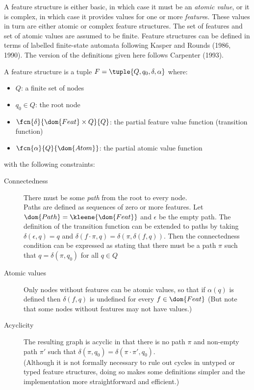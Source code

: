 \documentclass[12pt]{report}
\begin{document}
A feature structure is either basic, in which case it must
be an {\em atomic value}, or it is complex, in which case it
provides values for one or more {\em feature}s.  
These values in turn are either atomic or complex feature structures.
The set  of features and 
set  of atomic values are assumed to be finite.
Feature structures can be defined in terms of
labelled finite-state automata
following Kasper and Rounds (1986, 1990).  The version of the
definitions given here follows Carpenter (1993).    
%
\begin{definition}
A feature structure is a tuple $F =
\tuple{Q,q_{0},\delta,\alpha}$ where:
\begin{itemize}
\item
$Q$:  a finite set of nodes 
\item
$q_{0} \in Q$: the root node
\item
$\fcn{\delta}{\dom{Feat} \times Q}{Q}$:  
the partial feature value function (transition function)
\item
$\fcn{\alpha}{Q}{\dom{Atom}}$: the partial atomic value function
\end{itemize}
with the following constraints:
\begin{description}
\item [Connectedness] 
There must be some {\em path} from the root to every node.\\
Paths are defined as sequences of zero or more features.
Let $\dom{Path} = \kleene{\dom{Feat}}$ and $\epsilon$ be the empty path.  
The definition of the transition function can be extended to paths by taking
$\delta(\epsilon,q) = q$ and $\delta(f\cdot\pi, q) =
\delta(\pi,\delta(f,q))$.  Then the connectedness condition
can be expressed as stating that there must be a path 
$\pi$ such that $q = \delta(\pi,q_{0})$ for all $q \in Q$
\item [Atomic values]
Only nodes without features can be atomic values, so that if
$\alpha(q)$ is defined then $\delta(f,q)$ is undefined for every $f
\in \dom{Feat}$
{\rm (But note that some nodes without
features may not have values.)}
\item [Acyclicity] The resulting graph is acyclic in that
there is no path $\pi$ and non-empty path $\pi'$ such that
$\delta(\pi,q_{0}) = \delta(\pi \cdot \pi',q_{0})$. \\
{\rm (Although it is not formally 
necessary to rule out cycles in untyped or typed
feature structures, doing so makes some definitions 
simpler and the implementation more straightforward and efficient.)}
\end{description}
\end{definition}
\end{document}
